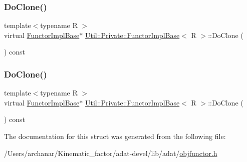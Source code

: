 \subsubsection{\texorpdfstring{DoClone()}{DoClone()}\hspace{0.1cm}{\footnotesize\ttfamily [2/3]}}
{\footnotesize\ttfamily template$<$typename R $>$ \\
virtual \mbox{\hyperlink{structUtil_1_1Private_1_1FunctorImplBase}{Functor\+Impl\+Base}}$\ast$ \mbox{\hyperlink{structUtil_1_1Private_1_1FunctorImplBase}{Util\+::\+Private\+::\+Functor\+Impl\+Base}}$<$ R $>$\+::Do\+Clone (\begin{DoxyParamCaption}{ }\end{DoxyParamCaption}) const\hspace{0.3cm}{\ttfamily [pure virtual]}}

\mbox{\label{structUtil_1_1Private_1_1FunctorImplBase_a3e0e91d434c55173ed546839b53721c5}} 
\subsubsection{\texorpdfstring{DoClone()}{DoClone()}\hspace{0.1cm}{\footnotesize\ttfamily [3/3]}}
{\footnotesize\ttfamily template$<$typename R $>$ \\
virtual \mbox{\hyperlink{structUtil_1_1Private_1_1FunctorImplBase}{Functor\+Impl\+Base}}$\ast$ \mbox{\hyperlink{structUtil_1_1Private_1_1FunctorImplBase}{Util\+::\+Private\+::\+Functor\+Impl\+Base}}$<$ R $>$\+::Do\+Clone (\begin{DoxyParamCaption}{ }\end{DoxyParamCaption}) const\hspace{0.3cm}{\ttfamily [pure virtual]}}



The documentation for this struct was generated from the following file\+:\begin{DoxyCompactItemize}
\item 
/\+Users/archanar/\+Kinematic\+\_\+factor/adat-\/devel/lib/adat/\mbox{\hyperlink{adat-devel_2lib_2adat_2objfunctor_8h}{objfunctor.\+h}}\end{DoxyCompactItemize}
